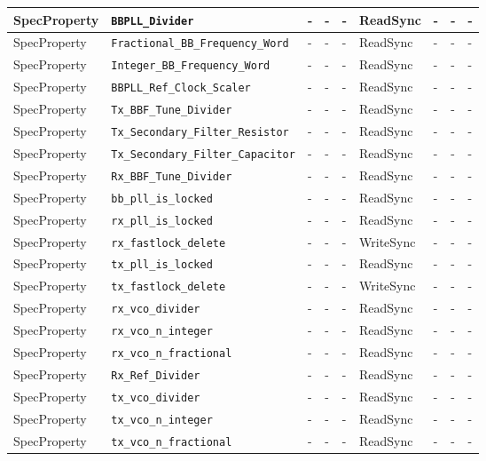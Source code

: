 \documentclass{article}
\begin{document}
\begin{landscape}
\begin{scriptsize}
\begin{longtable}{|p{2cm}|p{4cm}|p{1cm}|p{2cm}|p{2cm}|p{2cm}|p{2cm}|p{1cm}|p{4.58cm}|}
			\hline
			SpecProperty & \verb+BBPLL_Divider+ & - & - & - & ReadSync & - & - & - \\
			\hline
			SpecProperty & \verb+Fractional_BB_Frequency_Word+ & - & - & - & ReadSync & - & - & - \\
			\hline
			SpecProperty & \verb+Integer_BB_Frequency_Word+ & - & - & - & ReadSync & - & - & - \\
			\hline
			SpecProperty & \verb+BBPLL_Ref_Clock_Scaler+ & - & - & - & ReadSync & - & - & - \\
			\hline
			SpecProperty & \verb+Tx_BBF_Tune_Divider+ & - & - & - & ReadSync & - & - & - \\
			\hline
			SpecProperty & \verb+Tx_Secondary_Filter_Resistor+ & - & - & - & ReadSync & - & - & - \\
			\hline
			SpecProperty & \verb+Tx_Secondary_Filter_Capacitor+ & - & - & - & ReadSync & - & - & - \\
			\hline
			SpecProperty & \verb+Rx_BBF_Tune_Divider+ & - & - & - & ReadSync & - & - & - \\
			\hline
			SpecProperty & \verb+bb_pll_is_locked+ & - & - & - & ReadSync  & - & - & - \\
			\hline
			SpecProperty & \verb+rx_pll_is_locked+ & - & - & - & ReadSync  & - & - & - \\
			\hline
			SpecProperty & \verb+rx_fastlock_delete+ & - & - & - & WriteSync & - & - & - \\
			\hline
			SpecProperty & \verb+tx_pll_is_locked+ & - & - & - & ReadSync  & - & - & - \\
			\hline
			SpecProperty & \verb+tx_fastlock_delete+ & - & - & - & WriteSync & - & - & - \\
			\hline
			SpecProperty & \verb+rx_vco_divider+ & - & - & - & ReadSync  & - & - & - \\
			\hline
			SpecProperty & \verb+rx_vco_n_integer+ & - & - & - & ReadSync  & - & - & - \\
			\hline
			SpecProperty & \verb+rx_vco_n_fractional+ & - & - & - & ReadSync  & - & - & - \\
			\hline
			SpecProperty & \verb+Rx_Ref_Divider+ & - & - & - & ReadSync  & - & - & - \\
			\hline
			SpecProperty & \verb+tx_vco_divider+ & - & - & - & ReadSync  & - & - & - \\
			\hline
			SpecProperty & \verb+tx_vco_n_integer+ & - & - & - & ReadSync  & - & - & - \\
			\hline
			SpecProperty & \verb+tx_vco_n_fractional+ & - & - & - & ReadSync  & - & - & - \\

\end{longtable}
\end{scriptsize}
\end{landscape}
\end{document}
